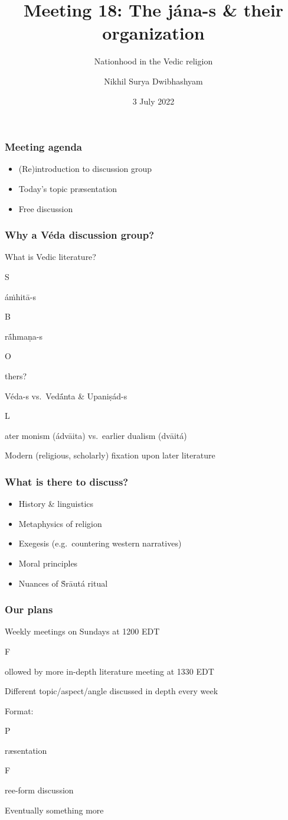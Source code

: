 \documentclass[pdf]{beamer}
\title{Meeting 18: The jána-s \& their organization}
\subtitle{Nationhood in the Vedic religion}
\author{Nikhil Surya Dwibhashyam}
\date{3 July 2022}
\newcommand{\Subitem}[1]{{\setlength\itemindent{12pt} \item[-] #1}}
\begin{document}
\frame{\titlepage}

\begin{frame} \frametitle{Meeting agenda}
\begin{itemize}
	\item (Re)introduction to discussion group
	\item Today's topic præsentation
	\item Free discussion
\end{itemize}
\end{frame}

\begin{frame} \frametitle{Why a Véda discussion group?}
\begin{itemize}
	\item What is Vedic literature?
	\Subitem Sáṁhitā-s
	\Subitem Brā́hmaṇa-s
	\Subitem Others?
	\item Véda-s vs.~Vedā́nta \& Upaniṣád-s
	\Subitem Later monism (ádvāita) vs.~earlier dualism (dvāitá)
	\item Modern (religious, scholarly) fixation upon later literature
\end{itemize}
\end{frame}

\begin{frame} \frametitle{What is there to discuss?}
\begin{itemize}
	\item History \& linguistics
	\item Metaphysics of religion
	\item Exegesis (e.g.~countering western narratives)
	\item Moral principles
	\item Nuances of Ṡrāutá ritual
\end{itemize}
\end{frame}

\begin{frame} \frametitle{Our plans}
\begin{itemize}
	\item Weekly meetings on Sundays at 1200 EDT
	\Subitem Followed by more in-depth literature meeting at 1330 EDT
	\item Different topic/aspect/angle discussed in depth every week
	\item Format:
	\Subitem Præsentation
	\Subitem Free-form discussion
	\item Eventually something more
\end{itemize}
\end{frame}
\end{document}
